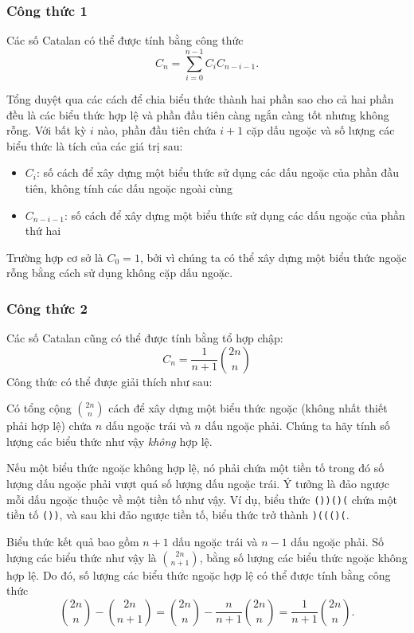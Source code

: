 \subsubsection{Công thức 1}

Các số Catalan có thể được tính bằng công thức
\[ C_n = \sum_{i=0}^{n-1} C_{i} C_{n-i-1}.\]

Tổng duyệt qua các cách để chia
biểu thức thành hai phần
sao cho cả hai phần đều là các biểu thức
hợp lệ và phần đầu tiên càng ngắn càng tốt
nhưng không rỗng.
Với bất kỳ $i$ nào, phần đầu tiên chứa $i+1$ cặp
dấu ngoặc và số lượng các biểu thức
là tích của các giá trị sau:

\begin{itemize}
\item $C_{i}$: số cách để xây dựng một biểu thức
sử dụng các dấu ngoặc của phần đầu tiên,
không tính các dấu ngoặc ngoài cùng
\item $C_{n-i-1}$: số cách để xây dựng một
biểu thức sử dụng các dấu ngoặc của phần thứ hai
\end{itemize}

Trường hợp cơ sở là $C_0=1$,
bởi vì chúng ta có thể xây dựng một biểu thức ngoặc
rỗng bằng cách sử dụng không cặp dấu ngoặc.

\subsubsection{Công thức 2}

Các số Catalan cũng có thể được tính
bằng tổ hợp chập:
\[ C_n = \frac{1}{n+1} {2n \choose n}\]
Công thức có thể được giải thích như sau:

Có tổng cộng ${2n \choose n}$ cách
để xây dựng một biểu thức ngoặc (không nhất thiết phải hợp lệ)
chứa $n$ dấu ngoặc trái
và $n$ dấu ngoặc phải.
Chúng ta hãy tính số lượng các
biểu thức như vậy \emph{không} hợp lệ.

Nếu một biểu thức ngoặc không hợp lệ,
nó phải chứa một tiền tố trong đó
số lượng dấu ngoặc phải vượt quá
số lượng dấu ngoặc trái.
Ý tưởng là đảo ngược mỗi dấu ngoặc
thuộc về một tiền tố như vậy.
Ví dụ, biểu thức
\texttt{())()(} chứa một tiền tố \texttt{())},
và sau khi đảo ngược tiền tố,
biểu thức trở thành \texttt{)((()(}.

Biểu thức kết quả bao gồm $n+1$
dấu ngoặc trái và $n-1$ dấu ngoặc phải.
Số lượng các biểu thức như vậy là ${2n \choose n+1}$,
bằng số lượng các biểu thức
ngoặc không hợp lệ.
Do đó, số lượng các biểu thức ngoặc
hợp lệ có thể được tính bằng công thức
\[{2n \choose n}-{2n \choose n+1} = {2n \choose n} - \frac{n}{n+1} {2n \choose n} = \frac{1}{n+1} {2n \choose n}.\]

